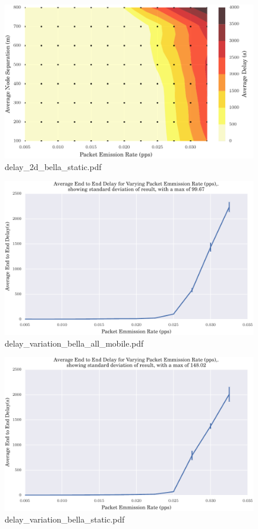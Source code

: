 \documentclass{article}
\begin{document}
\begin{figure}[h!]
\centering
\includegraphics[width=\linewidth]{delay_2d_bella_static.pdf}
\caption{delay\_2d\_bella\_static.pdf}
\end{figure}




\begin{figure}[h!]
\centering
\includegraphics[width=\linewidth]{delay_variation_bella_all_mobile.pdf}
\caption{delay\_variation\_bella\_all\_mobile.pdf}
\end{figure}




\begin{figure}[h!]
\centering
\includegraphics[width=\linewidth]{delay_variation_bella_static.pdf}
\caption{delay\_variation\_bella\_static.pdf}
\end{figure}
\end{document}
